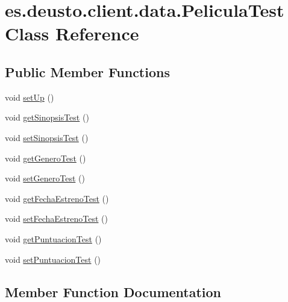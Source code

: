 \hypertarget{classes_1_1deusto_1_1client_1_1data_1_1_pelicula_test}{}\section{es.\+deusto.\+client.\+data.\+Pelicula\+Test Class Reference}
\label{classes_1_1deusto_1_1client_1_1data_1_1_pelicula_test}
\subsection*{Public Member Functions}
\begin{DoxyCompactItemize}
\item 
void \mbox{\hyperlink{classes_1_1deusto_1_1client_1_1data_1_1_pelicula_test_a9c5dde13ae55f8d389db5a36d1f13fd1}{set\+Up}} ()
\item 
void \mbox{\hyperlink{classes_1_1deusto_1_1client_1_1data_1_1_pelicula_test_adfb86d5b9de9adb49ce479819894feb5}{get\+Sinopsis\+Test}} ()
\item 
void \mbox{\hyperlink{classes_1_1deusto_1_1client_1_1data_1_1_pelicula_test_a6f1e767e4d22a993afb8905dcafe01ec}{set\+Sinopsis\+Test}} ()
\item 
void \mbox{\hyperlink{classes_1_1deusto_1_1client_1_1data_1_1_pelicula_test_ac34d618d337d6db5ba8db5c3dbdc85b3}{get\+Genero\+Test}} ()
\item 
void \mbox{\hyperlink{classes_1_1deusto_1_1client_1_1data_1_1_pelicula_test_a7b8384637f1680ca5d5a867f7d559534}{set\+Genero\+Test}} ()
\item 
void \mbox{\hyperlink{classes_1_1deusto_1_1client_1_1data_1_1_pelicula_test_acaec46c30b1919ac338efcca405d8266}{get\+Fecha\+Estreno\+Test}} ()
\item 
void \mbox{\hyperlink{classes_1_1deusto_1_1client_1_1data_1_1_pelicula_test_ae4918de040bffdb2d8ecbef199034d6c}{set\+Fecha\+Estreno\+Test}} ()
\item 
void \mbox{\hyperlink{classes_1_1deusto_1_1client_1_1data_1_1_pelicula_test_a7e3e376f87f5f89cd376a69e9a0038c6}{get\+Puntuacion\+Test}} ()
\item 
void \mbox{\hyperlink{classes_1_1deusto_1_1client_1_1data_1_1_pelicula_test_a789f9b889c39a78853974c238e45bb00}{set\+Puntuacion\+Test}} ()
\end{DoxyCompactItemize}


\subsection{Member Function Documentation}
\mbox{\label{classes_1_1deusto_1_1client_1_1data_1_1_pelicula_test_acaec46c30b1919ac338efcca405d8266}} 
